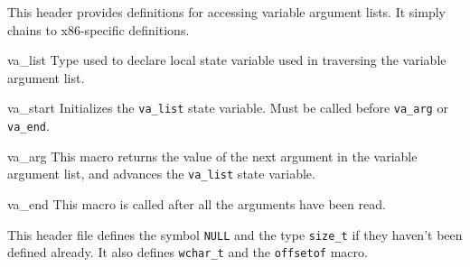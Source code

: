 \label{stdard-h}
\begin{apidesc}
	This header provides definitions for accessing
	variable argument lists.
	It simply chains to x86-specific definitions.

	\begin{icsymlist}
	\item[va_list]
		Type used to declare local state variable used in traversing
		the variable argument list.
	\item[va_start]
		Initializes the \texttt{va_list} state variable. 
		Must be called before \texttt{va_arg} or \texttt{va_end}.
	\item[va_arg]
		This macro returns the value of the next argument in the
		variable argument list, and advances the \texttt{va_list} 
		state variable.
	\item[va_end]
		This macro is called after all the arguments have been read.  
	\end{icsymlist}
\end{apidesc}

\label{stddef-h}
\begin{apidesc}
	This header file defines the symbol {\tt NULL}
	and the type {\tt size_t}
	if they haven't been defined already.
	It also defines \texttt{wchar_t} and the \texttt{offsetof} macro.
\end{apidesc}

